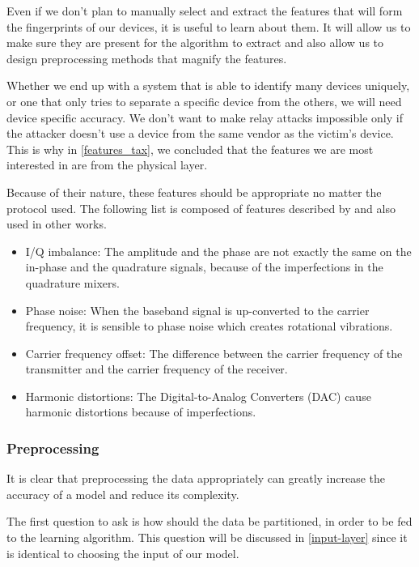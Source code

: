 Even if we don't plan to manually select and extract the features that will form the fingerprints of our devices, it is useful to learn about them. It will allow us to make sure they are present for the algorithm to extract and also allow us to design preprocessing methods that magnify the features.

Whether we end up with a system that is able to identify many devices uniquely, or one that only tries to separate a specific device from the others, we will need device specific accuracy. We don't want to make relay attacks impossible only if the attacker doesn't use a device from the same vendor as the victim's device. This is why in \autoref{features_tax}, we concluded that the features we are most interested in are from the physical layer.

Because of their nature, these features should be appropriate no matter the protocol used. The following list is composed of features described by \textcite{riyaz_deep_2018} and also used in other works.

\begin{itemize}
  \item{I/Q imbalance:} The amplitude and the phase are not exactly the same on the in-phase and the quadrature signals, because of the imperfections in the quadrature mixers.
  \item{Phase noise:} When the baseband signal is up-converted to the carrier frequency, it is sensible to phase noise which creates rotational vibrations.
  \item{Carrier frequency offset:} The difference between the carrier frequency of the transmitter and the carrier frequency of the receiver.
  \item{Harmonic distortions:} The Digital-to-Analog Converters (DAC) cause harmonic distortions because of imperfections.
\end{itemize}

\subsubsection{Preprocessing}

It is clear that preprocessing the data appropriately can greatly increase the accuracy of a model and reduce its complexity.

The first question to ask is how should the data be partitioned, in order to be fed to the learning algorithm. This question will be discussed in \autoref{input-layer} since it is identical to choosing the input of our model.

